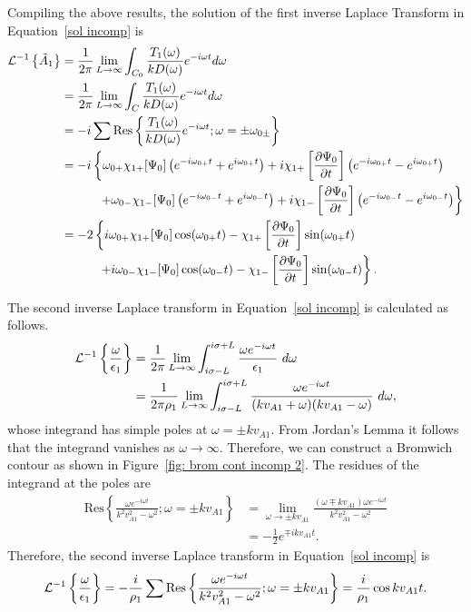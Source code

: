 \documentclass[12pt]{../style-files/ociamthesis}
\begin{document}
Compiling the above results, the solution of the first inverse Laplace Transform in Equation~\eqref{sol incomp} is
\begin{align}
\mathcal{L}^{-1}\left\{ \tilde{A}_1 \right\} &= \frac{1}{2\pi} \lim_{L \to \infty} \int_{C_0} \frac{T_1(\omega)}{kD(\omega)} e^{-i\omega t} d\omega \\
&= \frac{1}{2\pi} \lim_{L \to \infty} \int_{C} \frac{T_1(\omega)}{kD(\omega)} e^{-i\omega t} d\omega \notag \\
&= -i \sum \mathrm{Res}\left\{\frac{T_1(\omega)}{kD(\omega)}e^{-i\omega t}; \omega = \pm \omega_{0\pm} \right\} \notag \\
&= -i \left\{\omega_{0+}\chi_{1+}[\Psi_0] \left(e^{-i\omega_{0+} t} + e^{i\omega_{0+} t}\right) + i\chi_{1+}\left[ \frac{\partial \Psi_0}{\partial t} \right] \left(e^{-i\omega_{0+} t} - e^{i\omega_{0+} t}\right) \right. \notag \\
& \qquad\quad \left. + \omega_{0-}\chi_{1-}[\Psi_0] \left(e^{-i\omega_{0-} t} + e^{i\omega_{0-} t}\right) + i\chi_{1-}\left[ \frac{\partial \Psi_0}{\partial t} \right] \left(e^{-i\omega_{0-} t} - e^{i\omega_{0-} t}\right)\right\} \notag \\
&= -2 \left\{ i\omega_{0+}\chi_{1+}[\Psi_0] \cos(\omega_{0+} t) - \chi_{1+}\left[ \frac{\partial \Psi_0}{\partial t} \right] \sin(\omega_{0+} t) \right. \notag \\
& \qquad\quad \left. + i\omega_{0-}\chi_{1-}[\Psi_0] \cos(\omega_{0-} t) - \chi_{1-}\left[ \frac{\partial \Psi_0}{\partial t} \right] \sin(\omega_{0-} t) \right\}.
\end{align}


The second inverse Laplace transform in Equation~\eqref{sol incomp} is calculated as follows.
\begin{align}
\mathcal{L}^{-1}\left\{ \frac{\omega}{\epsilon_1} \right\} &= \frac{1}{2\pi}\lim_{L \to \infty} \int_{i\sigma - L}^{i\sigma + L} \frac{\omega e^{-i\omega t}}{\epsilon_1} ~d\omega \notag \\
&= \frac{1}{2\pi\rho_1}\lim_{L \to \infty} \int_{i\sigma - L}^{i\sigma + L} \frac{\omega e^{-i\omega t}}{(kv_{A1} + \omega)(kv_{A1} - \omega)} ~d\omega,
\end{align}
whose integrand has simple poles at $\omega = \pm k v_{A1}$. From Jordan's Lemma it follows that the integrand vanishes as $\omega \to \infty$. Therefore, we can construct a Bromwich contour as shown in Figure~\ref{fig: brom cont incomp 2}. The residues of the integrand at the poles are
\begin{align}
\mathrm{Res}\left\{\frac{\omega e^{-i\omega t}}{k^2v_{A1}^2 - \omega^2}; \omega = \pm kv_{A1} \right\} &= 
\lim_{\omega \to \pm kv_{A1}} \frac{(\omega \mp kv_{A1}) \omega e^{-i\omega t}}{k^2v_{A1}^2 - \omega^2} \\ 
&= -\frac{1}{2}e^{\mp ikv_{A1} t}.
\end{align}
Therefore, the second inverse Laplace transform in Equation~\eqref{sol incomp} is
\begin{equation}
\mathcal{L}^{-1}\left\{ \frac{\omega}{\epsilon_1} \right\} = -\frac{i}{\rho_1} \sum \mathrm{Res} \left\{ \frac{\omega e^{-i\omega t}}{k^2v_{A1}^2 - \omega^2}; \omega = \pm kv_{A1} \right\} = \frac{i}{\rho_1}\cos{kv_{A1}t}.
\end{equation}
\end{document}
